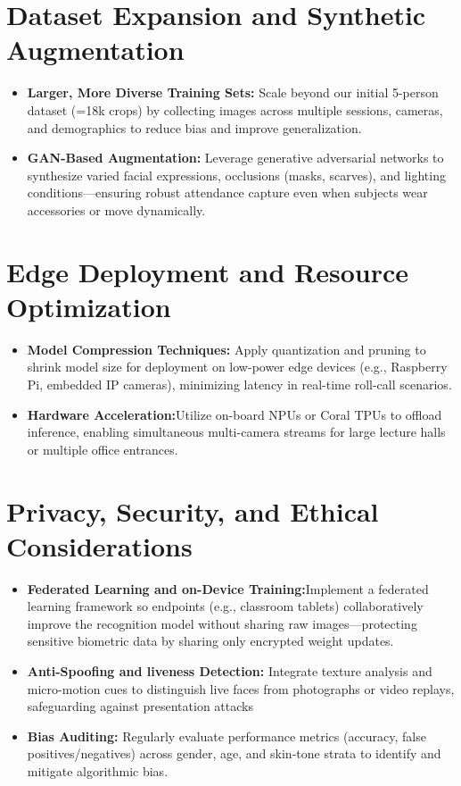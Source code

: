\documentclass[openany]{report}
\begin{document}
\section{Dataset Expansion and Synthetic Augmentation}
\begin{itemize}
    \item \textbf{Larger, More Diverse Training Sets:} Scale beyond our initial 5-person dataset (=18k crops) by collecting images across multiple sessions, cameras, and demographics to reduce bias and improve generalization.
    \item \textbf{GAN-Based Augmentation:} Leverage generative adversarial networks to synthesize varied facial expressions, occlusions (masks, scarves), and lighting conditions—ensuring robust attendance capture even when subjects wear accessories or move dynamically.
\end{itemize}

\section{Edge Deployment and Resource Optimization}
\begin{itemize}
    \item \textbf{Model Compression Techniques:} Apply quantization and pruning to shrink model size for deployment on low-power edge devices (e.g., Raspberry Pi, embedded IP cameras), minimizing latency in real-time roll-call scenarios.
    \item \textbf{Hardware Acceleration:}Utilize on-board NPUs or Coral TPUs to offload inference, enabling simultaneous multi-camera streams for large lecture halls or multiple office entrances.
\end{itemize}
\section{Privacy, Security, and Ethical Considerations}
\begin{itemize}
    \item \textbf{Federated Learning and on-Device Training:}Implement a federated learning framework so endpoints (e.g., classroom tablets) collaboratively improve the recognition model without sharing raw images—protecting sensitive biometric data by sharing only encrypted weight updates.
    \item \textbf{Anti-Spoofing and liveness Detection:} Integrate texture analysis and micro-motion cues to distinguish live faces from photographs or video replays, safeguarding against presentation attacks
    \item \textbf{Bias Auditing:} Regularly evaluate performance metrics (accuracy, false positives/negatives) across gender, age, and skin-tone strata to identify and mitigate algorithmic bias.
\end{itemize}
\end{document}
